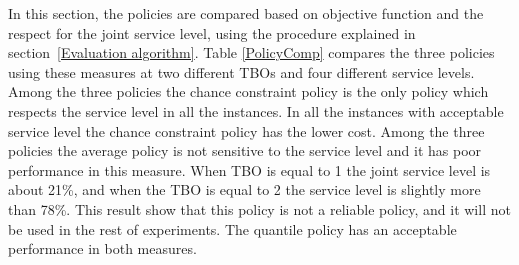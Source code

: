\documentclass[10pt]{article}
\begin{document}
In this section, the policies are compared based on objective function and the respect for the joint service level, using the procedure explained in section~\ref{Evaluation algorithm}. Table \ref{PolicyComp} compares the three policies using these measures at two different TBOs and four different service levels. Among the three policies the chance constraint policy is the only policy which respects the service level in all the instances. In all the instances with acceptable service level the chance constraint policy has the lower cost. Among the three policies the average policy is not sensitive to the service level and it has poor performance in this measure. When TBO is equal to 1 the joint service level is about 21\%, and when the TBO is equal to 2 the service level is slightly more than 78\%. This result show that this policy is not a reliable policy, and it will not be used in the rest of experiments. The quantile policy has an acceptable performance in both measures. 


\newcommand{\nm}[1]{\textnormal{#1}}
\end{document}
